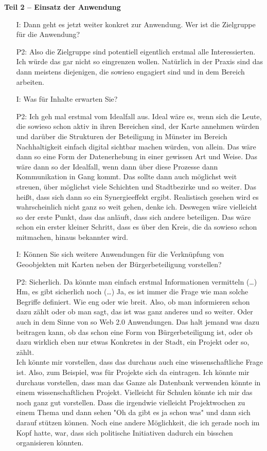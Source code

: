 \textbf{Teil 2 -- Einsatz der Anwendung}
\begin{itemize}
    \item[I:] Dann geht es jetzt weiter konkret zur Anwendung. Wer ist die Zielgruppe f{\"u}r die Anwendung?
    \item[P2:] Also die Zielgruppe sind potentiell eigentlich erstmal alle Interessierten. Ich w{\"u}rde das gar nicht so eingrenzen wollen. Nat{\"u}rlich in der Praxis sind das dann meistens diejenigen, die sowieso engagiert sind und in dem Bereich arbeiten.
    \item[I:] Was f{\"u}r Inhalte erwarten Sie?
    \item[P2:] Ich geh mal erstmal vom Idealfall aus. Ideal w{\"a}re es, wenn sich die Leute, die sowieso schon aktiv in ihren Bereichen sind, der Karte annehmen w{\"u}rden und dar{\"u}ber die Strukturen der Beteiligung in M{\"u}nster im Bereich Nachhaltigkeit einfach digital sichtbar machen w{\"u}rden, von allein. Das w{\"a}re dann so eine Form der Datenerhebung in einer gewissen Art und Weise. Das w{\"a}re dann so der Idealfall, wenn dann {\"u}ber diese Prozesse dann Kommunikation in Gang kommt. Das sollte dann auch m{\"o}glichst weit streuen, {\"u}ber m{\"o}glichst viele Schichten und Stadtbezirke und so weiter. Das hei{\ss}t, dass sich dann so ein Synergieeffekt ergibt. Realistisch gesehen wird es wahrscheinlich nicht ganz so weit gehen, denke ich. Deswegen w{\"a}re vielleicht so der erste Punkt, dass das anl{\"a}uft, dass sich andere beteiligen. Das w{\"a}re schon ein erster kleiner Schritt, dass es {\"u}ber den Kreis, die da sowieso schon mitmachen, hinaus bekannter wird.
    \item[I:] K{\"o}nnen Sie sich weitere Anwendungen f{\"u}r die Verkn{\"u}pfung von Geoobjekten mit Karten neben der B{\"u}rgerbeteiligung vorstellen?
    \item[P2:] Sicherlich. Da k{\"o}nnte man einfach erstmal Informationen vermitteln (\dots) Hm, es gibt sicherlich noch (\dots) Ja, es ist immer die Frage wie man solche Begriffe definiert. Wie eng oder wie breit. Also, ob man informieren schon dazu z{\"a}hlt oder ob man sagt, das ist was ganz anderes und so weiter. Oder auch in dem Sinne von so Web 2.0 Anwendungen. Das halt jemand was dazu beitragen kann, ob das schon eine Form von B{\"u}rgerbeteiligung ist, oder ob dazu wirklich eben nur etwas Konkretes in der Stadt, ein Projekt oder so, z{\"a}hlt.\\
    Ich k{\"o}nnte mir vorstellen, dass das durchaus auch eine wissenschaftliche Frage ist. Also, zum Beispiel, was f{\"u}r Projekte sich da eintragen. Ich k{\"o}nnte mir durchaus vorstellen, dass man das Ganze als Datenbank verwenden k{\"o}nnte in einem wissenschaftlichen Projekt. Vielleicht f{\"u}r Schulen k{\"o}nnte ich mir das noch ganz gut vorstellen. Dass die irgendwie vielleicht Projektwochen zu einem Thema und dann sehen "Oh da gibt es ja schon was" und dann sich darauf st{\"u}tzen k{\"o}nnen. Noch eine andere M{\"o}glichkeit, die ich gerade noch im Kopf hatte, war, dass sich politische Initiativen dadurch ein bisschen organisieren k{\"o}nnten.\\

\end{itemize}
